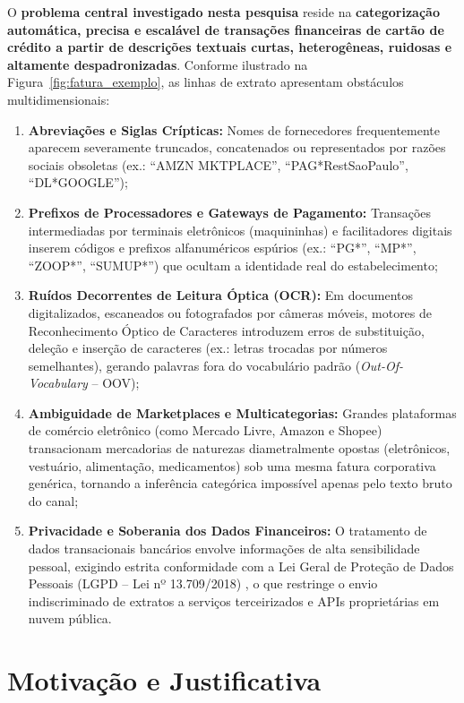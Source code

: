 \documentclass[
	12pt,				
	openright,			
	oneside,			
	a4paper,			
	english,			
	brazil				
	]{abntex2}
\begin{document}
O \textbf{problema central investigado nesta pesquisa} reside na \textbf{categorização automática, precisa e escalável de transações financeiras de cartão de crédito a partir de descrições textuais curtas, heterogêneas, ruidosas e altamente despadronizadas}. Conforme ilustrado na Figura~\ref{fig:fatura_exemplo}, as linhas de extrato apresentam obstáculos multidimensionais:
\begin{enumerate}
    \item \textbf{Abreviações e Siglas Crípticas:} Nomes de fornecedores frequentemente aparecem severamente truncados, concatenados ou representados por razões sociais obsoletas (ex.: ``AMZN MKTPLACE'', ``PAG*RestSaoPaulo'', ``DL*GOOGLE'');
    \item \textbf{Prefixos de Processadores e Gateways de Pagamento:} Transações intermediadas por terminais eletrônicos (maquininhas) e facilitadores digitais inserem códigos e prefixos alfanuméricos espúrios (ex.: ``PG*'', ``MP*'', ``ZOOP*'', ``SUMUP*'') que ocultam a identidade real do estabelecimento;
    \item \textbf{Ruídos Decorrentes de Leitura Óptica (OCR):} Em documentos digitalizados, escaneados ou fotografados por câmeras móveis, motores de Reconhecimento Óptico de Caracteres introduzem erros de substituição, deleção e inserção de caracteres (ex.: letras trocadas por números semelhantes), gerando palavras fora do vocabulário padrão (\textit{Out-Of-Vocabulary} -- OOV);
    \item \textbf{Ambiguidade de Marketplaces e Multicategorias:} Grandes plataformas de comércio eletrônico (como Mercado Livre, Amazon e Shopee) transacionam mercadorias de naturezas diametralmente opostas (eletrônicos, vestuário, alimentação, medicamentos) sob uma mesma fatura corporativa genérica, tornando a inferência categórica impossível apenas pelo texto bruto do canal;
    \item \textbf{Privacidade e Soberania dos Dados Financeiros:} O tratamento de dados transacionais bancários envolve informações de alta sensibilidade pessoal, exigindo estrita conformidade com a Lei Geral de Proteção de Dados Pessoais (LGPD -- Lei nº 13.709/2018) \cite{brasil2018lgpd}, o que restringe o envio indiscriminado de extratos a serviços terceirizados e APIs proprietárias em nuvem pública.
\end{enumerate}

\section{Motivação e Justificativa}
\label{sec:intro_motivacao}
\end{document}
